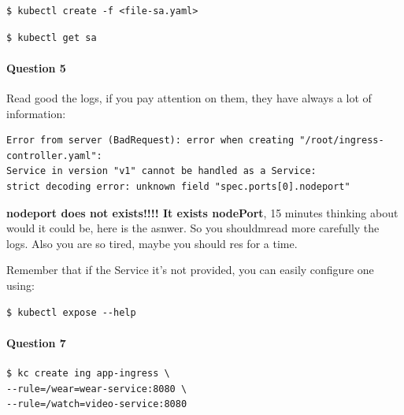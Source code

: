 \documentclass{article}
\newenvironment{blocktemplate}[1]{%
    \tcolorbox[beamer,%
    noparskip,breakable,
    colframe=Blue,%
    colbacklower=LimeGreen!75!LightGreen,%
    title=#1]}%
    {\endtcolorbox}
\newenvironment{codetemplate}[1][]{%
  \mybasecolorbox[#1]
  \itshape
}{%
  \endmybasecolorbox
}
\begin{document}
\begin{codetemplate}{}
\begin{verbatim}
$ kubectl create -f <file-sa.yaml>
\end{verbatim}
\end{codetemplate}

\begin{codetemplate}{}
\begin{verbatim}
$ kubectl get sa
\end{verbatim}
\end{codetemplate}

\paragraph{Question 5}
Read good the logs, if you pay attention on them, they have always a lot of information:
\begin{codetemplate}{}
\begin{verbatim}
Error from server (BadRequest): error when creating "/root/ingress-controller.yaml": 
Service in version "v1" cannot be handled as a Service: 
strict decoding error: unknown field "spec.ports[0].nodeport"
\end{verbatim}
\end{codetemplate}

\textbf{nodeport does not exists!!!! It exists nodePort}, 15 minutes thinking about would it could be, here is the asnwer. So you shouldmread more carefully the logs. Also you are so tired, maybe you should res for a time.

\begin{blocktemplate}{NOTE}
Remember that if the Service it's not provided, you can easily configure one using:
\begin{codetemplate}{}
\begin{verbatim}
$ kubectl expose --help
\end{verbatim}
\end{codetemplate}
\end{blocktemplate}

\paragraph{Question 7}

\begin{codetemplate}{}
\begin{verbatim}
$ kc create ing app-ingress \
--rule=/wear=wear-service:8080 \
--rule=/watch=video-service:8080
\end{verbatim}
\end{codetemplate}
\end{document}
